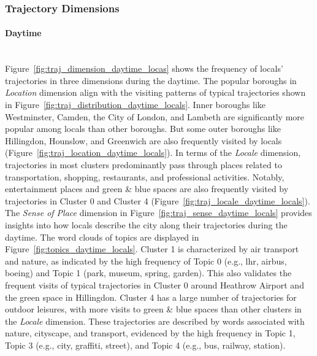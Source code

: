 \documentclass{article}
\newcommand{\subsubsubsection}[1]{\paragraph{#1}\mbox{}\\}
\theoremstyle{remark}
\begin{document}
\clearpage

\subsubsection{Trajectory Dimensions} \label{traj_dimensions}

\subsubsubsection{Daytime}

Figure~\ref{fig:traj_dimension_daytime_locas} shows the frequency of locals' trajectories in three dimensions during the daytime. The popular boroughs in \textit{Location} dimension align with the visiting patterns of typical trajectories shown in Figure~\ref{fig:traj_distribution_daytime_locals}. Inner boroughs like Westminster, Camden, the City of London, and Lambeth are significantly more popular among locals than other boroughs. But some outer boroughs like Hillingdon, Hounslow, and Greenwich are also frequently visited by locals (Figure~\ref{fig:traj_location_daytime_locals}). In terms of the \textit{Locale} dimension, trajectories in most clusters predominantly pass through places related to transportation, shopping, restaurants, and professional activities. Notably, entertainment places and green \& blue spaces are also frequently visited by trajectories in Cluster 0 and Cluster 4 (Figure~\ref{fig:traj_locale_daytime_locals}). The \textit{Sense of Place} dimension in Figure~\ref{fig:traj_sense_daytime_locals} provides insights into how locals describe the city along their trajectories during the daytime. The word clouds of topics are displayed in Figure~\ref{fig:topics_daytime_locals}. Cluster 1 is characterized by air transport and nature, as indicated by the high frequency of Topic 0 (e.g., lhr, airbus, boeing) and Topic 1 (park, museum, spring, garden). This also validates the frequent visits of typical trajectories in Cluster 0 around Heathrow Airport and the green space in Hillingdon. Cluster 4 has a large number of trajectories for outdoor leisures, with more visits to green \& blue spaces than other clusters in the \textit{Locale} dimension. These trajectories are described by words associated with nature, cityscape, and transport, evidenced by the high frequency in Topic 1, Topic 3 (e.g., city, graffiti, street), and Topic 4 (e.g., bus, railway, station).
\end{document}
